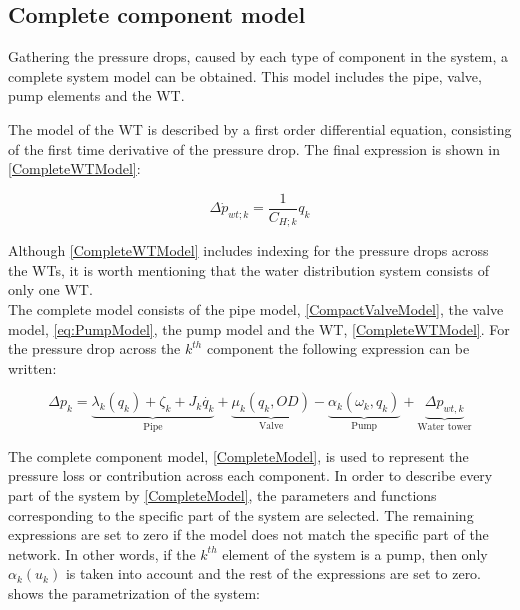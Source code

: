 \subsection{Complete component model}
\label{CompleteSystemModel}
Gathering the pressure drops, caused by each type of component in the system, a complete system model can be obtained. This model includes the pipe, valve, pump elements and the WT. 

The model of the WT is described by a first order differential equation, consisting of the first time derivative of the pressure drop. The final expression is shown in \eqref{CompleteWTModel}:

\begin{equation}
  \label{CompleteWTModel}
  \Delta \dot{p}_{wt;k} = \frac{1}{C_{H;k}} q_k 
\end{equation}

Although \eqref{CompleteWTModel} includes indexing for the pressure drops across the WTs, it is worth mentioning that the water distribution system consists of only one WT.
\\
The complete model consists of the pipe model, \eqref{CompactValveModel}, the valve model, \eqref{eq:PumpModel}, the pump model and the WT, \eqref{CompleteWTModel}. For the pressure drop across the $k^{th}$ component the following expression can be written: 

%

\begin{equation}
\label{CompleteModel}
\Delta p_k = \underbrace{\lambda_k (q_k) + \zeta_k + J_k \dot{q_k}}_\text{Pipe} + \underbrace{\mu_k (q_k, OD)}_\text{Valve} - \underbrace{\alpha_k(\omega_k,q_k)}_\text{Pump} + \underbrace{\Delta p_{wt,k}}_\text{Water tower}
\end{equation}

The complete component model, \eqref{CompleteModel}, is used to represent the pressure loss or contribution across each component. In order to describe every part of the system by \eqref{CompleteModel}, the parameters and functions corresponding to the specific part of the system are selected. The remaining expressions are set to zero if the model does not match the specific part of the network. In other words, if the $k^{th}$ element of the system is a pump, then only $\alpha_k(u_k)$ is taken into account and the rest of the expressions are set to zero. 
 shows the parametrization of the system: 


